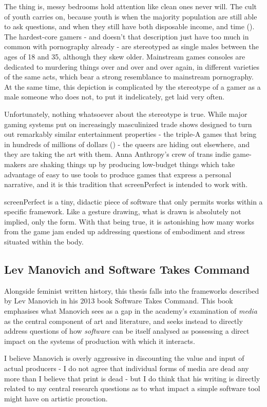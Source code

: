 The thing is, messy bedrooms hold attention like clean ones never will. The cult of youth carries on, because youth is when the majority population are still able to ask questions, and when they still have both disposable income, and time (\cite{economyterrible}). The hardest-core gamers - and doesn't that description just have too much in common with pornography already - are stereotyped as single males between the ages of 18 and 35, although they skew older. Mainstream games consoles are dedicated to murdering things over and over and over again, in different varieties of the same acts, which bear a strong resemblance to mainstream pornography. At the same time, this depiction is complicated by the stereotype of a gamer as a male someone who does not, to put it indelicately, get laid very often.

Unfortunately, nothing whatsoever about the stereotype is true. While major gaming systems put on increasingly masculinized trade shows designed to turn out remarkably similar entertainment properties - the triple-A games that bring in hundreds of millions of dollars (\cite{valueofaaa}) - the queers are hiding out elsewhere, and they are taking the art with them. Anna Anthropy's crew of trans indie game-makers are shaking things up by producing low-budget things which take advantage of easy to use tools to produce games that express a personal narrative, and it is this tradition that screenPerfect is intended to work with.

screenPerfect is a tiny, didactic piece of software that only permits works within a specific framework. Like a gesture drawing, what is drawn is absolutely not implied, only the form. With that being true, it is astonishing how many works from the game jam ended up addressing questions of embodiment and stress situated within the body.

\subsection{Lev Manovich and Software Takes Command}
Alongside feminist written history, this thesis falls into the frameworks described by Lev Manovich in his 2013 book Software Takes Command. This book emphasises what Manovich sees as a gap in the academy's examination of \textit{media} as the central component of art and literature, and seeks instead to directly address questions of how \textit{software} can be itself analysed as possessing a direct impact on the systems of production with which it interacts.

I believe Manovich is overly aggressive in discounting the value and input of actual producers - I do not agree that individual forms of media are dead any more than I believe that print is dead - but I do think that his writing is directly related to my central research questions as to what impact a simple software tool might have on artistic prouction.
